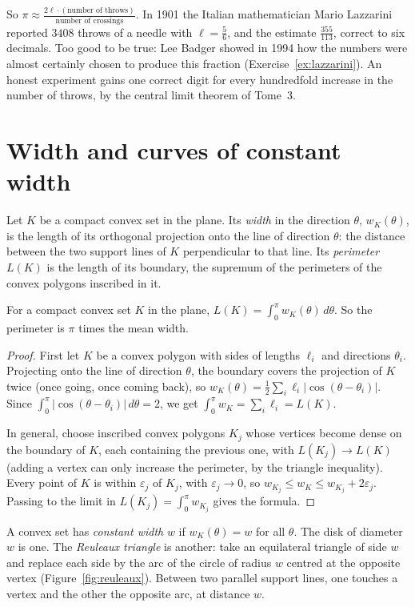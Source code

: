 So $\pi\approx\frac{2\ell\cdot(\text{number of throws})}{\text{number of crossings}}$. In 1901 the Italian mathematician Mario Lazzarini reported $3408$ throws of a
needle with $\ell=\frac56$, and the estimate $\frac{355}{113}$, correct to six decimals. Too good to be true: Lee Badger showed in 1994 how the numbers were
almost certainly chosen to produce this fraction (Exercise~\ref{ex:lazzarini}). An honest experiment gains one correct digit for every hundredfold increase in
the number of throws, by the central limit theorem of Tome~3.

\section{Width and curves of constant width}

Let $K$ be a compact convex set in the plane. Its \emph{width} in the direction $\theta$, $w_K(\theta)$, is the length of its orthogonal projection onto the
line of direction $\theta$: the distance between the two support lines of $K$ perpendicular to that line. Its \emph{perimeter} $L(K)$ is the length of its
boundary, the supremum of the perimeters of the convex polygons inscribed in it.

\begin{theorem}\label{thm:cauchy}
For a compact convex set $K$ in the plane, $L(K)=\int_0^\pi w_K(\theta)\,d\theta$. So the perimeter is $\pi$ times the mean width.
\end{theorem}

\begin{proof}
First let $K$ be a convex polygon with sides of lengths $\ell_i$ and directions $\theta_i$. Projecting onto the line of direction $\theta$, the boundary covers the
projection of $K$ twice (once going, once coming back), so $w_K(\theta)=\frac12\sum_i\ell_i|\cos(\theta-\theta_i)|$. Since
$\int_0^\pi|\cos(\theta-\theta_i)|\,d\theta=2$, we get $\int_0^\pi w_K=\sum_i\ell_i=L(K)$.

In general, choose inscribed convex polygons $K_j$ whose vertices become dense on the boundary of $K$, each containing the previous one, with
$L(K_j)\to L(K)$ (adding a vertex can only increase the perimeter, by the triangle inequality). Every point of $K$ is within $\varepsilon_j$ of $K_j$, with
$\varepsilon_j\to0$, so $w_{K_j}\le w_K\le w_{K_j}+2\varepsilon_j$. Passing to the limit in $L(K_j)=\int_0^\pi w_{K_j}$ gives the formula.
\end{proof}

A convex set has \emph{constant width} $w$ if $w_K(\theta)=w$ for all $\theta$. The disk of diameter $w$ is one. The \emph{Reuleaux triangle} is another:
take an equilateral triangle of side $w$ and replace each side by the arc of the circle of radius $w$ centred at the opposite vertex (Figure~\ref{fig:reuleaux}).
Between two parallel support lines, one touches a vertex and the other the opposite arc, at distance $w$.

